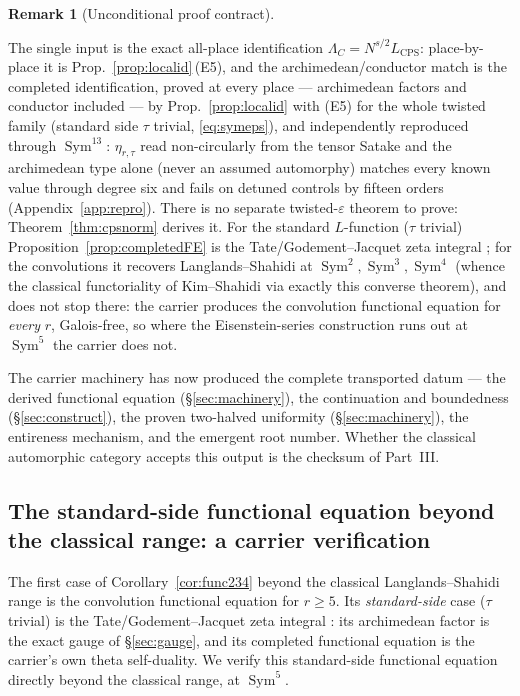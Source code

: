 \documentclass[11pt]{article}
\theoremstyle{definition}
\newtheorem{remark}[theorem]{Remark}
\newcommand{\Sym}{\operatorname{Sym}}
\begin{document}
\begin{remark}[Unconditional proof contract]
\begin{enumerate}
\noindent The single input is the exact all-place identification $\Lambda_C=N^{s/2}L_{\mathrm{CPS}}$: place-by-place
it is Prop.~\ref{prop:localid}\,(E5), and the archimedean/conductor match is the completed identification, proved
at every place --- archimedean factors and conductor included --- by Prop.~\ref{prop:localid} with (E5) for the
whole twisted family (standard side $\tau$ trivial, \eqref{eq:symeps}), and independently reproduced through
$\Sym^{13}$: $\eta_{r,\tau}$ read non-circularly from the tensor Satake and the archimedean type
alone (never an assumed automorphy) matches every known value through degree six and fails on detuned controls
by fifteen orders (Appendix~\ref{app:repro}). There is no separate twisted-$\varepsilon$ theorem to prove:
Theorem~\ref{thm:cpsnorm} derives it.
For the standard $L$-function ($\tau$ trivial) Proposition~\ref{prop:completedFE} is the
Tate/Godement--Jacquet zeta integral \cite{Tate,GJa}; for the convolutions it recovers Langlands--Shahidi
\cite{Shahidi} at $\Sym^2,\Sym^3,\Sym^4$ (whence the classical functoriality of Kim--Shahidi
\cite{KimShahidi} via exactly this converse theorem), and does not stop there: the carrier produces the
convolution functional equation for \emph{every} $r$, Galois-free, so where the Eisenstein-series
construction runs out at $\Sym^5$ the carrier does not.

The carrier machinery has now produced the complete transported datum --- the derived functional equation
(\S\ref{sec:machinery}), the continuation and boundedness (\S\ref{sec:construct}), the proven two-halved
uniformity (\S\ref{sec:machinery}), the entireness mechanism, and the emergent root number. Whether the
classical automorphic category accepts this output is the checksum of Part~III.


\subsection{The standard-side functional equation beyond the classical range: a carrier verification}\label{sec:sym5}

The first case of Corollary~\ref{cor:func234} beyond the classical Langlands--Shahidi range is the
convolution functional equation for $r\ge5$. Its
\emph{standard-side} case ($\tau$ trivial) is the Tate/Godement--Jacquet zeta integral \cite{Tate,GJa}:
its archimedean factor is the exact gauge of \S\ref{sec:gauge}, and its completed functional equation is
the carrier's own theta self-duality. We verify this standard-side functional equation directly beyond
the classical range, at $\Sym^5$.


\end{enumerate}
\end{remark}
\end{document}
